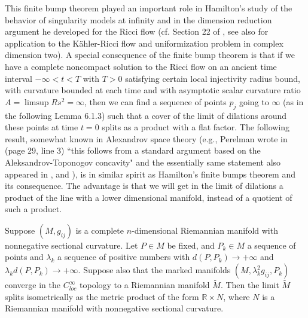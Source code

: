 \medskip
This finite bump theorem played an important role in Hamilton's
study of the behavior of singularity models at infinity and in the
dimension reduction argument he developed for the Ricci flow (cf.
Section 22 of \cite{Ha95F}, see also \cite{CTZ04} for application
to the K\"ahler-Ricci flow and uniformization problem in complex
dimension two). A special consequence of the finite bump theorem
is that if we have a complete noncompact solution to the Ricci
flow on an ancient time interval $-\infty<t<T$ with $T>0$
satisfying certain local injectivity radius bound, with curvature
bounded at each time and with asymptotic scalar curvature ratio
$A=\limsup Rs^2=\infty$, then we can find a sequence of points
$p_j$ going to $\infty$ (as in the following Lemma 6.1.3) such
that a cover of the limit of dilations around these points at time
$t=0$ splits as a product with a flat factor. The following
result, somewhat known in Alexandrov space theory (e.g., Perelman
wrote in \cite{P1} (page 29, line 3) ``this follows from a
standard argument based on the Aleksandrov-Toponogov concavity"
and the essentially same statement also appeared in \cite{KL},
\cite{CZ05F} and \cite{CLN}), is in similar spirit as Hamilton's
finite bumps theorem and its consequence. The advantage is that we
will get in the limit of dilations a product of the line with a
lower dimensional manifold, instead of a quotient of such a
product.

\begin{proposition}
  \label{prop:cz-pointed-limit-at-infinity-splits-line}

Suppose $(M,g_{ij})$ is a complete $n$-dimensional Riemannian
manifold with nonnegative sectional curvature. Let $P\in M$ be
fixed, and $P_k\in M$ a sequence of points and $\lambda_k$ a
sequence of positive numbers with $d(P,P_k)\rightarrow +\infty$
and $\lambda_kd(P,P_k)\rightarrow +\infty$. Suppose also that the
marked manifolds $(M,\lambda_k^2g_{ij},P_k)$ converge in the
$C^{\infty}_{loc}$ topology to a Riemannian manifold
$\widetilde{M}$. Then the limit $\widetilde{M}$ splits
isometrically as the metric product of the form $\mathbb{R}\times
N$, where $N$ is a Riemannian manifold with nonnegative sectional
curvature.
\end{proposition}

